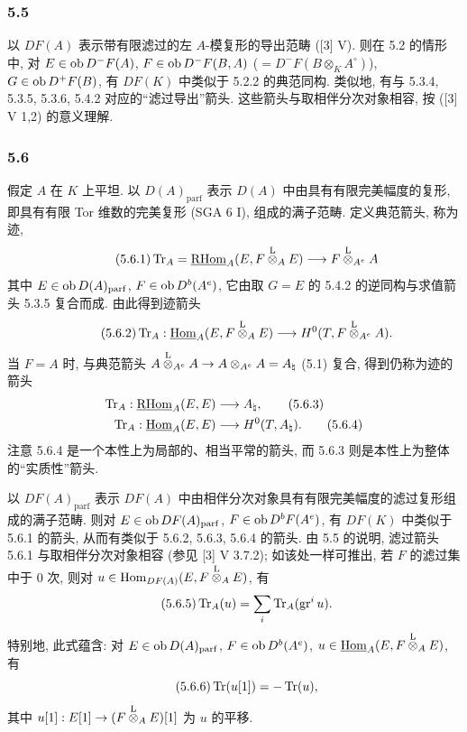 \subsubsection*{5.5}

以 $DF(A)$ 表示带有限滤过的左 $A$-模复形的导出范畴 ([3] V). 则在 5.2 的情形中, 对 $E\in\operatorname{ob} D^-F(A)$, $F\in\operatorname{ob} D^-F(B,A)$ ($=D^-F(B\otimes_KA^\circ)$), $G\in\operatorname{ob} D^+F(B)$, 有 $DF(K)$ 中类似于 5.2.2 的典范同构. 类似地, 有与 5.3.4, 5.3.5, 5.3.6, 5.4.2 对应的``滤过导出''箭头. 这些箭头与取相伴分次对象相容, 按 ([3] V 1,2) 的意义理解.

\subsubsection*{5.6}

假定 $A$ 在 $K$ 上平坦. 以 $D(A)_{\mathrm{parf}}$ 表示 $D(A)$ 中由具有有限完美幅度的复形, 即具有有限 Tor 维数的完美复形 (SGA 6 I), 组成的满子范畴. 定义典范箭头, 称为迹,
\begin{equation}\tag{5.6.1}
\operatorname{Tr}_A=\underline{\mathrm{RHom}}_A(E,F\overset{\mathrm L}{\otimes}_AE)\longrightarrow F\overset{\mathrm L}{\otimes}_{A^e}A
\end{equation}
其中 $E\in\operatorname{ob} D(A)_{\mathrm{parf}}$, $F\in\operatorname{ob} D^b(A^e)$, 它由取 $G=E$ 的 5.4.2 的逆同构与求值箭头 5.3.5 复合而成. 由此得到迹箭头
\begin{equation}\tag{5.6.2}
\operatorname{Tr}_A:\underline{\operatorname{Hom}}_A(E,F\overset{\mathrm L}{\otimes}_AE)\longrightarrow H^0(T,F\overset{\mathrm L}{\otimes}_{A^e}A).
\end{equation}
当 $F=A$ 时, 与典范箭头 $A\overset{\mathrm L}{\otimes}_{A^e}A\to A\otimes_{A^e}A=A_\natural$ (5.1) 复合, 得到仍称为迹的箭头
\begin{align}
\operatorname{Tr}_A:\underline{\mathrm{RHom}}_A(E,E)&\longrightarrow A_\natural,\tag{5.6.3}\\
\operatorname{Tr}_A:\underline{\operatorname{Hom}}_A(E,E)&\longrightarrow H^0(T,A_\natural).\tag{5.6.4}
\end{align}
注意 5.6.4 是一个本性上为局部的、相当平常的箭头, 而 5.6.3 则是本性上为整体的``实质性''箭头.

以 $DF(A)_{\mathrm{parf}}$ 表示 $DF(A)$ 中由相伴分次对象具有有限完美幅度的滤过复形组成的满子范畴. 则对 $E\in\operatorname{ob} DF(A)_{\mathrm{parf}}$, $F\in\operatorname{ob} D^bF(A^e)$, 有 $DF(K)$ 中类似于 5.6.1 的箭头, 从而有类似于 5.6.2, 5.6.3, 5.6.4 的箭头. 由 5.5 的说明, 滤过箭头 5.6.1 与取相伴分次对象相容 (参见 [3] V 3.7.2); 如该处一样可推出, 若 $F$ 的滤过集中于 $0$ 次, 则对 $u\in\operatorname{Hom}_{DF(A)}(E,F\overset{\mathrm L}{\otimes}_AE)$, 有
\begin{equation}\tag{5.6.5}
\operatorname{Tr}_A(u)=\sum_i\operatorname{Tr}_A(\operatorname{gr}^i u).
\end{equation}
特别地, 此式蕴含: 对 $E\in\operatorname{ob} D(A)_{\mathrm{parf}}$, $F\in\operatorname{ob} D^b(A^e)$, $u\in\underline{\operatorname{Hom}}_A(E,F\overset{\mathrm L}{\otimes}_AE)$, 有
\begin{equation}\tag{5.6.6}
\operatorname{Tr}(u[1])=-\operatorname{Tr}(u),
\end{equation}
其中 $u[1]:E[1]\to(F\overset{\mathrm L}{\otimes}_AE)[1]$ 为 $u$ 的平移.

